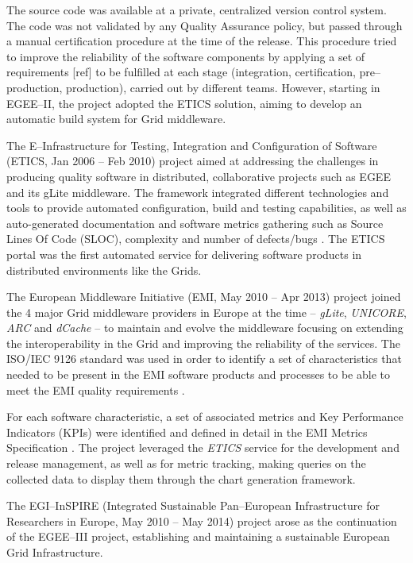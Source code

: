 \documentclass[journal]{IEEEtran}
\begin{document}
The
source code was available at a private, centralized version control system.
The code was not validated by any Quality Assurance policy, but passed through a manual
certification procedure at the time of the release. This procedure tried to
improve the reliability of the software components by applying a set of
requirements [ref] to be fulfilled at each stage (integration, certification,
pre--production, production), carried out by different teams. However, starting in
EGEE--II, the project adopted the ETICS solution, aiming to develop
an automatic build system for Grid middleware.

The E--Infrastructure for Testing, Integration and Configuration of Software
\cite{cordis:etics, cordis:etics2} (ETICS, Jan 2006 -- Feb 2010) project aimed
at addressing the challenges in producing quality software in distributed,
collaborative projects such as EGEE and its gLite middleware. The framework
integrated different technologies and tools to provide automated configuration,
build and testing capabilities, as well as auto-generated documentation and
software metrics gathering such as Source Lines Of Code (SLOC), complexity and
number of defects/bugs \cite{etics}. The ETICS portal was the first automated
service for delivering software products in distributed environments like
the Grids.

The European Middleware Initiative (EMI, May 2010 -- Apr 2013)
\cite{cordis:emi} project joined the 4 major Grid middleware providers in
Europe at the time -- {\sl gLite}, {\sl UNICORE}, {\sl ARC} and {\sl dCache} --
to maintain and evolve the middleware focusing on extending the
interoperability in the Grid and improving the reliability of the services. The
ISO/IEC 9126 \cite{iso-9126} standard was used in order to identify a set of
characteristics that needed to be present in the EMI software products and
processes to be able to meet the EMI quality requirements
\cite{emi-quality-model}.

For each software characteristic, a set of associated
metrics and Key Performance Indicators (KPIs) were identified and defined in
detail in the EMI Metrics Specification \cite{emi-metrics}. The project
leveraged the {\sl ETICS} service for the development and release management,
as well as for metric tracking, making queries on the collected data to display
them through the chart generation framework.

The EGI--InSPIRE (Integrated Sustainable Pan--European Infrastructure for
Researchers in Europe, May 2010 -- May 2014) project \cite{cordis:egi-inspire}
arose as the continuation of the EGEE--III project, establishing and
maintaining a sustainable European Grid Infrastructure.
\end{document}
